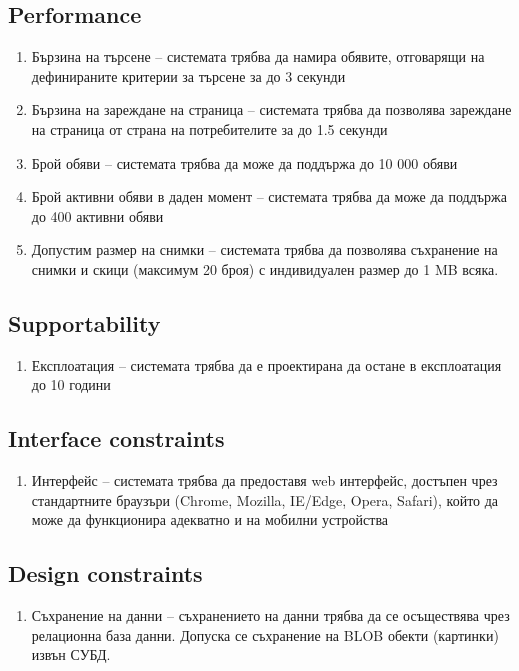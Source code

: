 \documentclass[]{article}
\begin{document}
\subsection{Performance}
\begin{enumerate}
\item Бързина на търсене -- системата трябва да намира обявите, отговарящи на дефинираните критерии за търсене за до 3 секунди
\item Бързина на зареждане на страница -- системата трябва да позволява зареждане на страница от страна на потребителите за до 1.5 секунди
\item Брой обяви -- системата трябва да може да поддържа до 10 000 обяви
\item Брой активни обяви в даден момент -- системата трябва да може да поддържа до 400 активни обяви
\item Допустим размер на снимки -- системата трябва да позволява съхранение на снимки и скици (максимум 20 броя) с индивидуален размер до 1 MB всяка.
\end{enumerate}

\subsection{Supportability}
\begin{enumerate}
\item Експлоатация -- системата трябва да е проектирана да остане в експлоатация до 10 години
\end{enumerate}

\subsection{Interface constraints}
\begin{enumerate}
\item Интерфейс -- системата трябва да предоставя web интерфейс, достъпен чрез стандартните браузъри (Chrome, Mozilla, IE/Edge, Opera, Safari), който да може да функционира адекватно и на мобилни устройства
\end{enumerate}

\subsection{Design constraints}
\begin{enumerate}
\item Съхранение на данни -- съхранението на данни трябва да се осъществява чрез релационна база данни. Допуска се съхранение на BLOB обекти (картинки) извън СУБД.
\end{enumerate}
\end{document}
